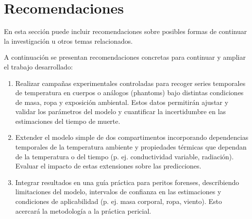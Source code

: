 \documentclass[a4paper,10pt]{article}
\begin{document}
\section{Recomendaciones}\label{sec:rec}

  En esta sección puede incluir recomendaciones sobre posibles formas de continuar
  la investigación u otros temas relacionados.

	A continuación se presentan recomendaciones concretas para continuar y ampliar
	el trabajo desarrollado:

	\begin{enumerate}
		\item Realizar campañas experimentales controladas para recoger series temporales
		de temperatura en cuerpos o análogos (phantoms) bajo distintas condiciones de
		masa, ropa y exposición ambiental. Estos datos permitirán ajustar y validar los
		parámetros del modelo y cuantificar la incertidumbre en las estimaciones del
		tiempo de muerte.

		\item Extender el modelo simple de dos compartimentos incorporando dependencias
		temporales de la temperatura ambiente y propiedades térmicas que dependan de la
		temperatura o del tiempo (p. ej. conductividad variable, radiación). Evaluar
		el impacto de estas extensiones sobre las predicciones.

		\item Integrar resultados en una guía práctica para peritos forenses, describiendo
		limitaciones del modelo, intervalos de confianza en las estimaciones y condiciones
		de aplicabilidad (p. ej. masa corporal, ropa, viento). Esto acercará la metodología
		a la práctica pericial.
	\end{enumerate}

\end{document}
